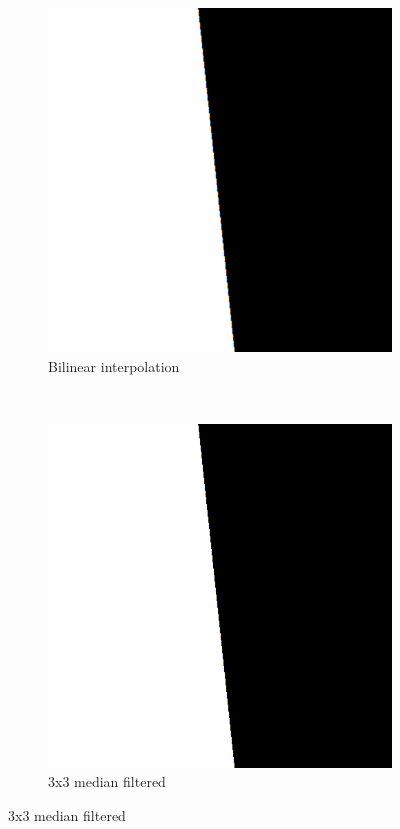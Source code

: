 \documentclass[a4paper]{article}
\begin{document}
\begin{figure}[H]
	\centering
	\begin{subfigure}[h]{0.48\textwidth}
		\centering
		\includegraphics[width=\textwidth]{black_and_white_bilinear_interpolated}
		\caption*{Bilinear interpolation}
	\end{subfigure}
	~
	\begin{subfigure}[h]{0.48\textwidth}
		\centering
		\includegraphics[width=\textwidth]{black_and_white_median_filtered_3x3}
		\caption*{3x3 median filtered}
	\end{subfigure}	
	

\end{figure}
\end{document}
